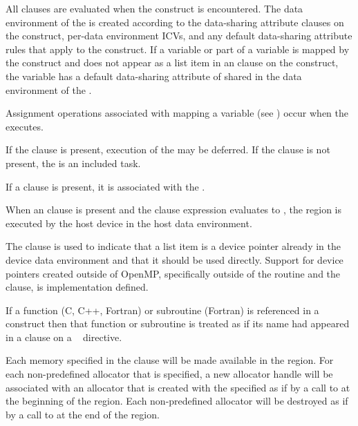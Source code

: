 All clauses are evaluated when the  construct is encountered.
The data environment of the  is created according to the
data-sharing attribute clauses on the  construct, per-data
environment ICVs, and any default data-sharing attribute rules that apply to
the  construct.  If a variable or part of a variable is mapped by
the  construct and does not appear as a list item in an
 clause on the construct, the variable has a default
data-sharing attribute of shared in the data environment of the .

Assignment operations associated with mapping a variable (see ) occur when the  executes.

If the  clause is present, execution of the  may be deferred.  If the  clause is not present, the  is an included task.

If a  clause is present, it is associated with the .

When an  clause is present and the  clause expression evaluates to , the  region is executed by the host device in the host data environment.

The  clause is used to indicate that a list item is a device
pointer already in the device data environment and that it should be used
directly.  Support for device pointers created outside of OpenMP, specifically
outside of the  routine and the  clause,
is implementation defined.

If a function (C, C++, Fortran) or subroutine (Fortran) is referenced in a
 construct then that function or subroutine is treated as if its
name had appeared in a  clause on a ~
directive.

Each memory  specified in the  clause will be made available in the  region. For each non-predefined allocator that is specified, a new allocator handle will be associated with an allocator that is created with the specified  as if by a call to  at the beginning of the  region. Each non-predefined allocator will be destroyed as if by a call to  at the end of the  region.


